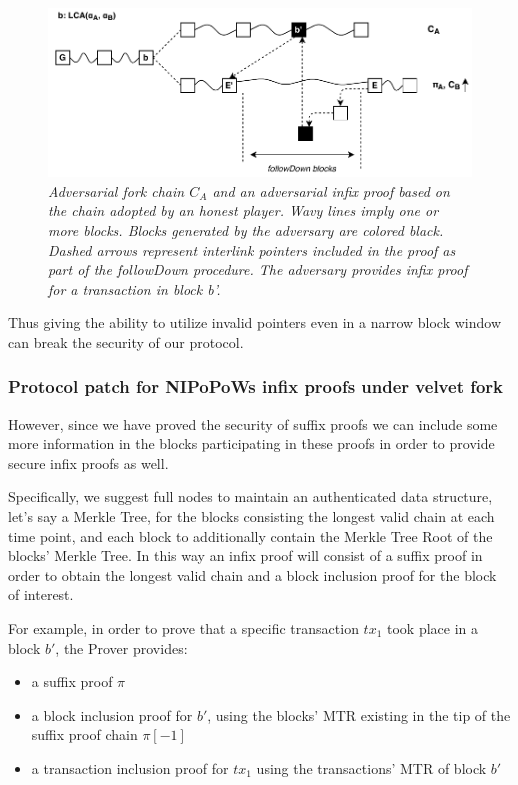 \documentclass[10pt,a4paper]{article}
\theoremstyle{plain}
\theoremstyle{definition}
\begin{document}
\begin{figure}[h!]
	\begin{center}
		\includegraphics[scale=0.75]{figures/infix_attack.pdf}
	\end{center}
	\caption{\textit{Adversarial fork chain $C_A$ and an adversarial infix proof based on the chain
	 adopted by an honest player. Wavy lines imply one or more blocks. Blocks generated by the
	 adversary are colored black. Dashed arrows represent interlink pointers included in the proof
	 as part of the \textit{followDown} procedure. The adversary provides infix proof for a
	 transaction in block b'. }}
	\label{fig:infix_attack}
\end{figure}

Thus giving the ability to utilize invalid pointers even in a narrow block window can break the
security of our protocol. 

\subsubsection*{Protocol patch for NIPoPoWs infix proofs under velvet fork}
However, since we have proved the security of suffix proofs we can include some more information
in the blocks participating in these proofs in order to provide secure infix proofs as well.
 
Specifically, we suggest full nodes to maintain an authenticated data structure, let's say a
Merkle Tree, for the blocks consisting the longest valid chain at each time point, and each
block to additionally contain the Merkle Tree Root of  the blocks' Merkle Tree. In this way an
infix proof will consist of a suffix proof in order to obtain the longest valid chain and a
block inclusion proof for the block of interest.

For example, in order to prove that a specific transaction $tx_1$ took place in a block $b'$,
the Prover provides:
\begin{itemize}
\item a suffix proof $\pi$
\item a block inclusion proof for $b'$, using the blocks' MTR existing in the tip of the
suffix proof chain $\pi[-1]$
\item a transaction inclusion proof for $tx_1$ using the transactions' MTR of block $b'$
\end{itemize}
\end{document}
